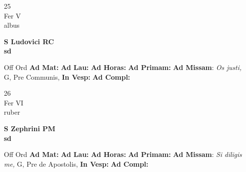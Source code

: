 \documentclass[10pt, openany]{book}
\begin{document}
        \begin{center}
            \begin{minipage}{3.5in}
                \vspace{2em}
                \begin{minipage}{0.5in}
                    {\Huge 25} \\
                    {\normalsize Fer V} \\
                    {\normalsize albus}
                \end{minipage}
                \begin{minipage}{3.0in}
                    \textbf{ \large S Ludovici RC \\
                    \textnormal{\normalsize sd}} \\ 
                \end{minipage}
                \begin{justify}Off Ord
                    \textbf{Ad Mat: }
                    \textbf{Ad Lau: }
                    \textbf{Ad Horas: }
                    \textbf{Ad Primam: }\textbf{Ad Missam}: \textit{Os justi,} G, Pre Communis,  
                    \textbf{In Vesp: }
                    \textbf{Ad Compl: }
                \end{justify}
            \end{minipage}
        \end{center}
    
        \begin{center}
            \begin{minipage}{3.5in}
                \vspace{2em}
                \begin{minipage}{0.5in}
                    {\Huge 26} \\
                    {\normalsize Fer VI} \\
                    {\normalsize ruber}
                \end{minipage}
                \begin{minipage}{3.0in}
                    \textbf{ \large S Zephrini PM \\
                    \textnormal{\normalsize sd}} \\ 
                \end{minipage}
                \begin{justify}Off Ord
                    \textbf{Ad Mat: }
                    \textbf{Ad Lau: }
                    \textbf{Ad Horas: }
                    \textbf{Ad Primam: }\textbf{Ad Missam}: \textit{Si diligis me,} G, Pre de Apostolis,  
                    \textbf{In Vesp: }
                    \textbf{Ad Compl: }
                \end{justify}
            \end{minipage}
        \end{center}
    
\end{document}
